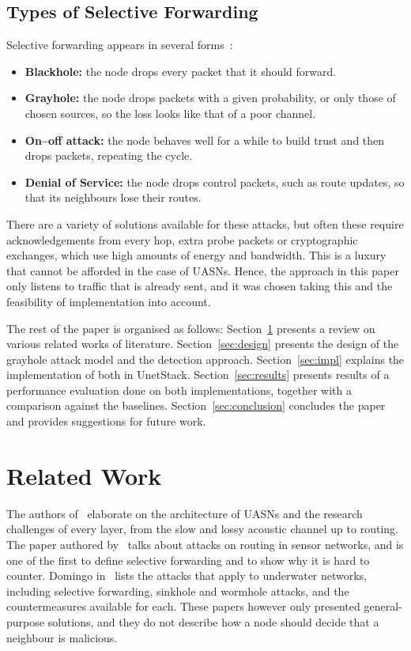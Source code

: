 \documentclass[conference]{IEEEtran}
\begin{document}
\subsection{Types of Selective Forwarding}
Selective forwarding appears in several forms~\cite{karlof,jiang}:
\begin{itemize}
\item \textbf{Blackhole:} the node drops every packet that it should forward.
\item \textbf{Grayhole:} the node drops packets with a given probability, or only those of chosen sources, so the loss looks like that of a poor channel.
\item \textbf{On--off attack:} the node behaves well for a while to build trust and then drops packets, repeating the cycle.
\item \textbf{Denial of Service:} the node drops control packets, such as route updates, so that its neighbours lose their routes.
\end{itemize}
There are a variety of solutions available for these attacks, but often these require acknowledgements from every hop, extra probe packets or cryptographic exchanges, which use high amounts of energy and bandwidth. This is a luxury that cannot be afforded in the case of UASNs. Hence, the approach in this paper only listens to traffic that is already sent, and it was chosen taking this and the feasibility of implementation into account.

The rest of the paper is organised as follows: Section~\ref{sec:related} presents a review on various related works of literature. Section~\ref{sec:design} presents the design of the grayhole attack model and the detection approach. Section~\ref{sec:impl} explains the implementation of both in UnetStack. Section~\ref{sec:results} presents results of a performance evaluation done on both implementations, together with a comparison against the baselines. Section~\ref{sec:conclusion} concludes the paper and provides suggestions for future work.

\section{Related Work}\label{sec:related}
The authors of~\cite{akyildiz} elaborate on the architecture of UASNs and the research challenges of every layer, from the slow and lossy acoustic channel up to routing. The paper authored by~\cite{karlof} talks about attacks on routing in sensor networks, and is one of the first to define selective forwarding and to show why it is hard to counter. Domingo in~\cite{domingo} lists the attacks that apply to underwater networks, including selective forwarding, sinkhole and wormhole attacks, and the countermeasures available for each. These papers however only presented general-purpose solutions, and they do not describe how a node should decide that a neighbour is malicious.
\end{document}
